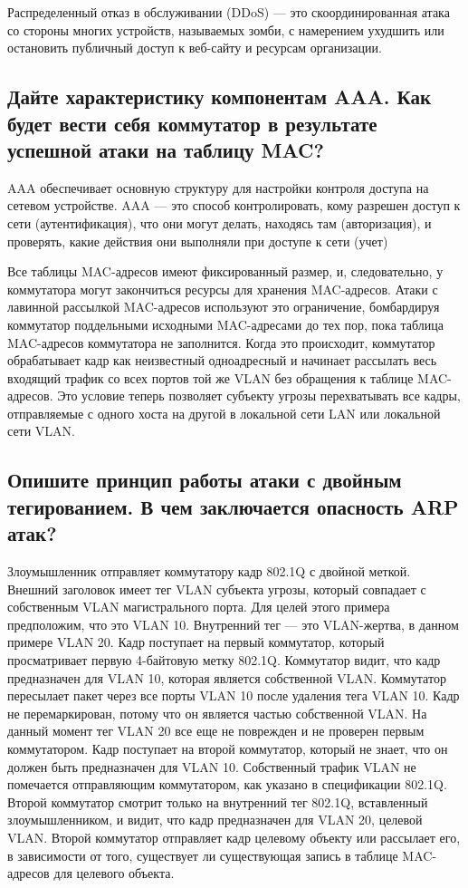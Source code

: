 Распределенный отказ в обслуживании (DDoS) — это скоординированная атака со стороны многих устройств, называемых зомби, с намерением ухудшить или остановить публичный доступ к веб-сайту и ресурсам организации.


\subsection{Дайте характеристику компонентам AAA. Как будет вести себя коммутатор в результате успешной атаки на таблицу MAC?}

AAA обеспечивает основную структуру для настройки контроля доступа на сетевом устройстве.
AAA — это способ контролировать, кому разрешен доступ к сети (аутентификация), что они могут делать, находясь там
(авторизация), и проверять, какие действия они выполняли при доступе к сети (учет)

Все таблицы MAC-адресов имеют фиксированный размер, и, следовательно, у коммутатора могут закончиться ресурсы для хранения MAC-адресов. Атаки с лавинной рассылкой MAC-адресов используют это ограничение, бомбардируя коммутатор поддельными исходными MAC-адресами до тех пор, пока таблица MAC-адресов коммутатора не заполнится.
Когда это происходит, коммутатор обрабатывает кадр как неизвестный одноадресный и начинает рассылать весь входящий трафик со всех портов той же VLAN без обращения к таблице MAC-адресов. Это условие теперь позволяет субъекту угрозы перехватывать все кадры, отправляемые с одного хоста на другой в локальной сети LAN или локальной сети VLAN.


\subsection{Опишите принцип работы атаки с двойным тегированием. В чем заключается опасность ARP атак?}

Злоумышленник отправляет коммутатору кадр 802.1Q с двойной меткой. Внешний заголовок имеет тег VLAN субъекта угрозы, который совпадает с собственным VLAN магистрального порта. Для целей этого примера предположим, что это VLAN 10. Внутренний тег — это VLAN-жертва, в данном примере VLAN 20.
Кадр поступает на первый коммутатор, который просматривает первую 4-байтовую метку 802.1Q. Коммутатор видит, что кадр предназначен для VLAN 10, которая является собственной VLAN. Коммутатор пересылает пакет через все порты VLAN 10 после удаления тега VLAN 10. Кадр не перемаркирован, потому что он является частью собственной VLAN. На данный момент тег VLAN 20 все еще не поврежден и не проверен первым коммутатором.
Кадр поступает на второй коммутатор, который не знает, что он должен быть предназначен для VLAN 10. Собственный трафик VLAN не помечается отправляющим коммутатором, как указано в спецификации 802.1Q. Второй коммутатор смотрит только на внутренний тег 802.1Q, вставленный злоумышленником, и видит, что кадр предназначен для VLAN 20, целевой VLAN. Второй коммутатор отправляет кадр целевому объекту или рассылает его, в зависимости от того, существует ли существующая запись в таблице MAC-адресов для целевого объекта.

